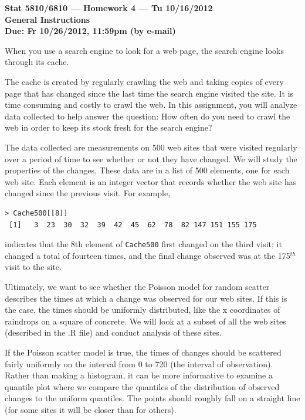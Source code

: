 \documentclass[11pt]{article}
\begin{document}
{\bf \Large
\noindent Stat 5810/6810 --- Homework 4 --- Tu 10/16/2012 \\[0.1in]
General Instructions \\[0.1in]
Due: Fr 10/26/2012, 11:59pm (by e-mail)
}

\vspace{2em}
When you use a search engine to look for a web page, the search engine looks through its cache. 

The cache is created by regularly crawling the web and taking copies of every page that has changed since the last time 
the search engine visited the site.  It is time consuming and costly to crawl the web. 
In this assignment, you will analyze data collected to help answer the question:
How often do you need to crawl the web in order to keep its stock fresh for the search engine? 

The data collected are measurements on 500 web sites that were visited regularly over a period of time to see whether or not they have changed.
We will study the properties of the changes. 
These data are in a list of 500 elements, one for each web site.  Each element is an integer vector that  records whether the web site has changed since the previous visit.  For example, 
\begin{verbatim}
> Cache500[[8]]
 [1]   3  23  30  32  39  42  45  62  78  82 147 151 155 175
 \end{verbatim}
 indicates that the 8th element of \texttt{Cache500} first changed on the third visit; it changed a total
 of fourteen times, and the final change observed was at the 175$^{th}$ visit to the site.

\vspace{1em}
Ultimately, we want to see whether the Poisson model for random scatter describes the times at 
which a change was observed for our web sites.  If this is the case, the times should 
be uniformly distributed, like the x coordinates of raindrops on a square of concrete.  
We will look at a subset of all the web sites (described in the .R file) and conduct analysis of these sites. 

If the Poisson scatter model is true, the times of changes should be 
scattered fairly uniformly on the interval from 0 to 720 (the interval of observation).  
Rather than making a histogram, it can be more informative to examine a quantile plot 
where we compare the quantiles of the distribution of observed changes to the 
uniform quantiles.  The points should  roughly fall on a straight line
(for some sites it will be closer than for others).  
\end{document}

